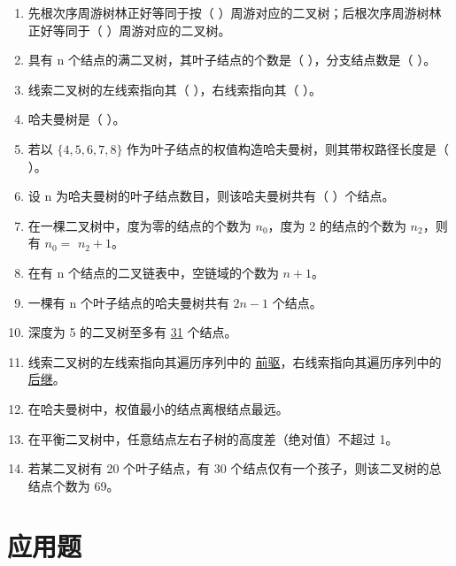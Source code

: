 \documentclass[12pt, a4paper]{article}
\begin{document}
\begin{enumerate}
	\item 先根次序周游树林正好等同于按（ ）周游对应的二叉树；后根次序周游树林正好等同于（ ）周游对应的二叉树。
	\item 具有 n 个结点的满二叉树，其叶子结点的个数是（ ），分支结点数是（ ）。
	\item 线索二叉树的左线索指向其（ ），右线索指向其（ ）。
	\item 哈夫曼树是（ ）。
	\item 若以 $\{4, 5, 6, 7, 8\}$ 作为叶子结点的权值构造哈夫曼树，则其带权路径长度是（ ）。
	\item 设 n 为哈夫曼树的叶子结点数目，则该哈夫曼树共有（ ）个结点。
	\item 在一棵二叉树中，度为零的结点的个数为 $n_0$，度为 2 的结点的个数为 $n_2$，则有 $n_0 =$ \underline{$n_2+1$}。
	\item 在有 n 个结点的二叉链表中，空链域的个数为 \underline{$n+1$}。
	\item 一棵有 n 个叶子结点的哈夫曼树共有 \underline{$2n-1$} 个结点。
	\item 深度为 5 的二叉树至多有 \underline{31} 个结点。
	\item 线索二叉树的左线索指向其遍历序列中的 \underline{前驱}，右线索指向其遍历序列中的 \underline{后继}。
	\item 在哈夫曼树中，权值最小的结点离根结点最远。
	\item 在平衡二叉树中，任意结点左右子树的高度差（绝对值）不超过 1。
	\item 若某二叉树有 20 个叶子结点，有 30 个结点仅有一个孩子，则该二叉树的总结点个数为 69。
\end{enumerate}

\section*{应用题}
\end{document}
